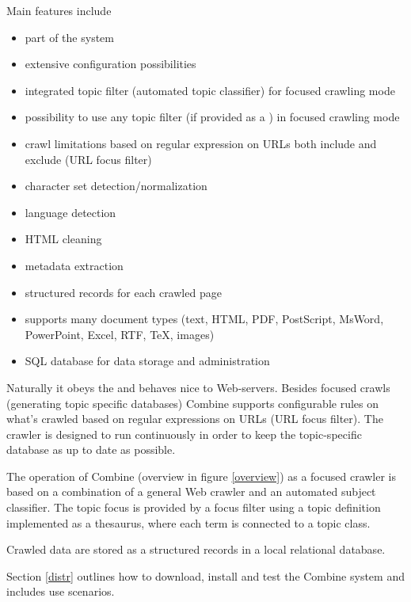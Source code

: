 Main features include
\begin{itemize}
\item part of the  system
\item extensive configuration possibilities
\item integrated topic filter (automated topic classifier) for focused crawling mode
\item possibility to use any topic filter (if provided as a ) in focused crawling mode
\item crawl limitations based on regular expression on URLs both include and exclude (URL focus filter)
\item character set detection/normalization
\item language detection
\item HTML cleaning
\item metadata extraction
\item structured records for each crawled page
\item supports many document types (text, HTML, PDF, PostScript, MsWord, PowerPoint, Excel, RTF, TeX, images)
\item SQL database for data storage and administration
\end{itemize}

Naturally it obeys the 
and behaves nice to Web-servers. Besides focused crawls (generating
topic specific databases) Combine supports configurable rules on
what's crawled based on regular expressions on URLs (URL focus filter).
The crawler is designed to run continuously in order to keep
the topic-specific database as up to date as possible.

The operation of Combine (overview in figure \ref{overview}) as a focused crawler is based on a combination of a
general Web crawler and an automated subject classifier. The topic
focus is provided by a focus filter using a topic
definition implemented as a thesaurus, where each term is connected to a
topic class.

Crawled data are stored as a
structured records in a local relational database.

Section \ref{distr}
 outlines how to download, install and test the Combine system and includes use scenarios.

